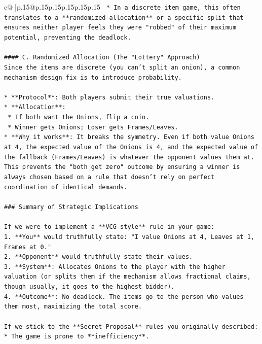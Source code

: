 \documentclass{article}
\begin{document}
{\begin{supertabular}{c@{$\;$}|p{.15\linewidth}@{}p{.15\linewidth}p{.15\linewidth}p{.15\linewidth}p{.15\linewidth}p{.15\linewidth}}
{{{\texttt{    *   In a discrete item game, this often translates to a **randomized allocation** or a specific split that ensures neither player feels they were "robbed" of their maximum potential, preventing the deadlock.} \\
\\ 
\texttt{\#\#\#\# C. Randomized Allocation (The "Lottery" Approach)} \\
\texttt{Since the items are discrete (you can't split an onion), a common mechanism design fix is to introduce probability.} \\
\\ 
\texttt{*   **Protocol**: Both players submit their true valuations.} \\
\texttt{*   **Allocation**:} \\
\texttt{    *   If both want the Onions, flip a coin.} \\
\texttt{    *   Winner gets Onions; Loser gets Frames/Leaves.} \\
\texttt{*   **Why it works**: It breaks the symmetry. Even if both value Onions at 4, the expected value of the Onions is 4, and the expected value of the fallback (Frames/Leaves) is whatever the opponent values them at. This prevents the "both get zero" outcome by ensuring a winner is always chosen based on a rule that doesn't rely on perfect coordination of identical demands.} \\
\\ 
\texttt{\#\#\# Summary of Strategic Implications} \\
\\ 
\texttt{If we were to implement a **VCG{-}style** rule in your game:} \\
\texttt{1.  **You** would truthfully state: "I value Onions at 4, Leaves at 1, Frames at 0."} \\
\texttt{2.  **Opponent** would truthfully state their values.} \\
\texttt{3.  **System**: Allocates Onions to the player with the higher valuation (or splits them if the mechanism allows fractional claims, though usually, it goes to the highest bidder).} \\
\texttt{4.  **Outcome**: No deadlock. The items go to the person who values them most, maximizing the total score.} \\
\\ 
\texttt{If we stick to the **Secret Proposal** rules you originally described:} \\
\texttt{*   The game is prone to **inefficiency**.} \\
}}}
\end{supertabular}}
\end{document}
